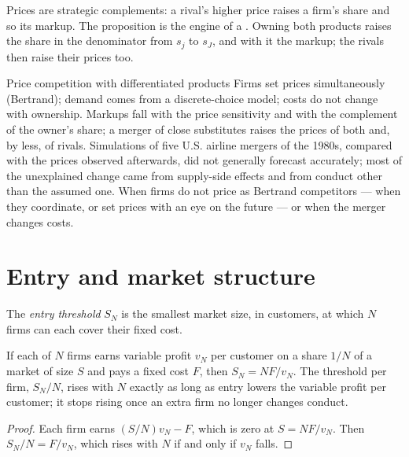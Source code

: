 Prices are strategic complements: a rival's higher price raises a firm's share and
so its markup. The proposition is the engine of a . Owning both
products raises the share in the denominator from $s_j$ to $s_J$, and with it the markup; the
rivals then raise their prices too.

\begin{model}{Price competition with differentiated products}
\assumes Firms set prices simultaneously (Bertrand); demand comes from a
discrete-choice model; costs do not change with ownership.
\predicts Markups fall with the price sensitivity and with the complement of the
owner's share; a merger of close substitutes raises the prices of both and,
by less, of rivals.
\tested Simulations of five U.S. airline mergers of the 1980s, compared with the
prices observed afterwards, did not generally forecast accurately; most of the
unexplained change came from supply-side effects and from conduct other than the
assumed one. %
\breaks When firms do not price as Bertrand competitors --- when they coordinate,
or set prices with an eye on the future --- or when the merger changes costs.
\end{model}

\section{Entry and market structure}\label{sec:b3:oligopoly-and-collusion:entry}

\begin{definition}\label{def:b3:oligopoly-and-collusion:entry-threshold}
The \emph{entry threshold} $S_N$ is the smallest market size, in customers, at which $N$
firms can each cover their fixed cost.
\end{definition}

\begin{proposition}\label{prop:b3:oligopoly-and-collusion:thresholds}
If each of $N$ firms earns variable profit $v_N$ per customer on a share $1/N$ of a market of size
$S$ and pays a fixed cost $F$, then $S_N = NF/v_N$. The threshold per firm, $S_N/N$, rises with $N$ exactly as long
as entry lowers the variable profit per customer; it stops rising once an extra firm
no longer changes conduct.
\end{proposition}

\begin{proof}
Each firm earns $(S/N)v_N - F$, which is zero at $S = NF/v_N$. Then $S_N/N = F/v_N$, which rises with $N$ if and
only if $v_N$ falls.
\end{proof}

